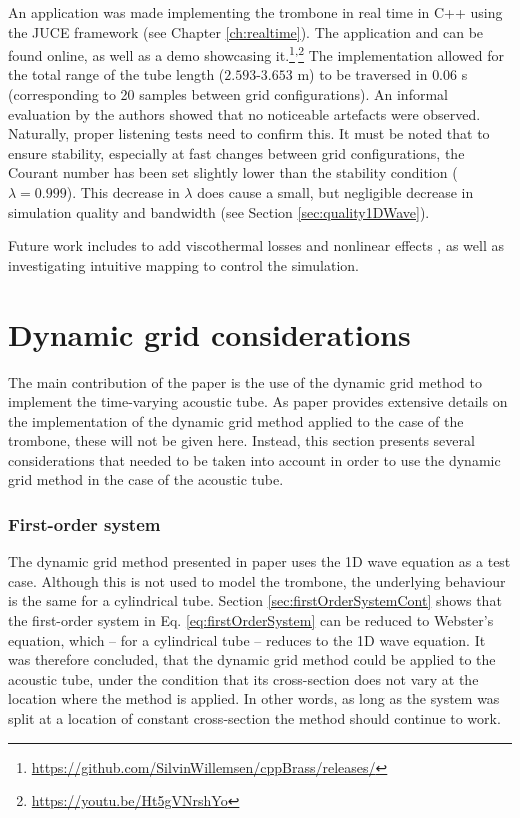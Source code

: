 An application was made implementing the trombone in real time in C++ using the JUCE framework (see Chapter \ref{ch:realtime}). The application and can be found online, as well as a demo showcasing it.\footnote{\url{https://github.com/SilvinWillemsen/cppBrass/releases/}}\textsuperscript{,}\footnote{\url{https://youtu.be/Ht5gVNrshYo}} The implementation allowed for the total range of the tube length ($2.593$-$3.653$ m) to be traversed in $0.06$ s (corresponding to 20 samples between grid configurations). An informal evaluation by the authors showed that no noticeable artefacts were observed. Naturally, proper listening tests need to confirm this. It must be noted that to ensure stability, especially at fast changes between grid configurations, the Courant number has been set slightly lower than the stability condition ($\lambda = 0.999$). This decrease in $\lambda$ does cause a small, but negligible decrease in simulation quality and bandwidth (see Section \ref{sec:quality1DWave}). 

Future work includes to add viscothermal losses \cite{Bilbao2016} and nonlinear effects \cite{msallam1997physical}, as well as investigating intuitive mapping to control the simulation.


\section{Dynamic grid considerations}
The main contribution of the paper is the use of the dynamic grid method to implement the time-varying acoustic tube. As paper \citeP[H] provides extensive details on the implementation of the dynamic grid method applied to the case of the trombone, these will not be given here. Instead, this section presents several considerations that needed to be taken into account in order to use the dynamic grid method in the case of the acoustic tube. 

\subsubsection{First-order system}
The dynamic grid method presented in paper \citeP[G] uses the 1D wave equation as a test case. Although this is not used to model the trombone, the underlying behaviour is the same for a cylindrical tube. Section \ref{sec:firstOrderSystemCont} shows that the first-order system in Eq. \eqref{eq:firstOrderSystem} can be reduced to Webster's equation, which -- for a cylindrical tube -- reduces to the 1D wave equation. It was therefore concluded, that the dynamic grid method could be applied to the acoustic tube, under the condition that its cross-section does not vary at the location where the method is applied. In other words, as long as the system was split at a location of constant cross-section %
the method should continue to work. 


